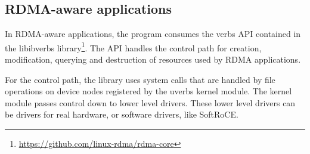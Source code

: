 






\subsection{RDMA-aware applications}

In RDMA-aware applications, the program consumes the verbs API contained in the libibverbs library\footnote{\url{https://github.com/linux-rdma/rdma-core}}.
The API handles the control path for creation, modification, querying and destruction of resources used by RDMA applications.

For the control path, the library uses system calls that are handled by file operations on device nodes
registered by the uverbs kernel module. The kernel module passes control down to lower level drivers.
These lower level drivers can be drivers for real hardware, or software drivers, like SoftRoCE.

